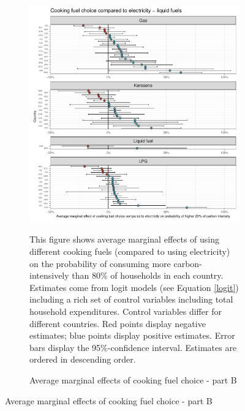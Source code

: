 \begin{figure}[ht!]\ContinuedFloat
   \centering
   \begin{subfigure}[b]{\textwidth}
   \centering
   \includegraphics{1_Figures/Analysis_Logit_Models_Marginal_Effects/Average_Marginal_Effects_affected_upper_80_CF_Electricity B_2017B.pdf}
   \caption{Average marginal effects of cooking fuel choice - part B} \label{fig:Logit_ME_CF_2}
   \begin{subcaption2}
     This figure shows average marginal effects of using different cooking fuels (compared to using electricity) on the probability of consuming more carbon-intensively than 80\% of households in each country. Estimates come from logit models (see Equation \ref{logit}) including a rich set of control variables including total household expenditures. Control variables differ for different countries. Red points display negative estimates; blue points display positive estimates. Error bars display the 95\%-confidence interval. Estimates are ordered in descending order.
   \end{subcaption2}
   \end{subfigure}
 \end{figure}
 \clearpage

